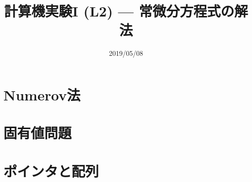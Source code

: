 \documentclass[dvipdfmx]{beamer}
\title{計算機実験I (L2) --- 常微分方程式の解法}
\date{2019/05/08}
\begin{document}
\begin{frame}
  \titlepage
  \tableofcontents
\end{frame}



\section{Numerov法}







\section{固有値問題}



\section{ポインタと配列}








\end{document}
